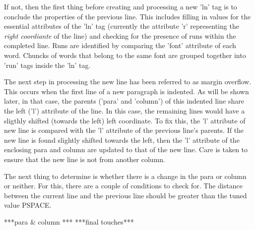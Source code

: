 If not, then the first thing before creating and processing a new 'ln' tag is to conclude the properties of the previous line.
This includes filling in values for the essential attributes of the 'ln' tag (currently the attribute 'r' representing the \emph{right coordiante} of the line) and checking for the presence of runs within the completed line.
Runs are identified by comparing the 'font' attribute of each word.
Chuncks of words that belong to the same font are grouped together into 'run' tags inside the 'ln' tag.

The next step in processing the new line has been referred to as margin overflow.
This occurs when the first line of a new paragraph is indented.
As will be shown later, in that case, the parents ('para' and 'column') of this indented line share the left ('l') attribute of the line.
In this case, the remaining lines would have a sligthly shifted (towards the left) left coordinate.
To fix this, the 'l' attribute of new line is compared with the 'l' attribute of the previous line's parents.
If the new line is found slightly shifted towards the left, then the 'l' attribute of the enclosing para and column are updated to that of the new line.
Care is taken to ensure that the new line is not from another column.

The next thing to determine is whether there is a change in the para or column or neither.
For this, there are a couple of conditions to check for.
The distance between the current line and the previous line should be greater than the tuned value PSPACE.

***para & column ***
***final touches***
